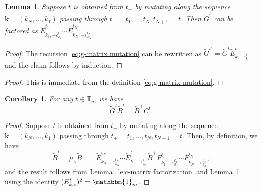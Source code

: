 \documentclass{amsart}
\newtheorem{corollary}[theorem]{Corollary}
\newtheorem{lemma}[theorem]{Lemma}
\numberwithin{theorem}{section}
\newcommand{\bfk}{{\boldsymbol{k}}}
\newcommand{\TT}{\mathbb{T}}
\newcommand{\bOne}{\mathbbm{1}}
\begin{document}
  \begin{lemma}
    \label{le:g-matrix factorization}
    Suppose $t$ is obtained from $t_+$ by mutating along the sequence $\bfk=(k_N,\ldots,k_1)$ passing through $t_+=t_1,\ldots,t_N,t_{N+1}=t$.
    Then $\widetilde G^t$ can be factored as $\widetilde E^{t_1}_{k_1,-\varepsilon^{t_1}_{k_1}}\cdots \widetilde E^{t_N}_{k_N,-\varepsilon^{t_N}_{k_N}}$.
  \end{lemma}
  \begin{proof}
    The recursion \eqref{eq:g-matrix mutation} can be rewritten as $\widetilde G^{t'}=\widetilde G^t \widetilde E^t_{k,-\varepsilon^t_k}$ and the claim follows by induction.
  \end{proof}
  \begin{proof}
    This is immediate from the definition \eqref{eq:g-matrix mutation}.
  \end{proof}

  \begin{corollary}
    For any $t\in\TT_n$, we have
    \[\widetilde G^t\widetilde B^t=\widetilde B^+ C^t.\]
  \end{corollary}
  \begin{proof}
    Suppose $t$ is obtained from $t_+$ by mutating along the sequence $\bfk=(k_N,\ldots,k_1)$ passing through $t_+=t_1,\ldots,t_N,t_{N+1}=t$.
    Then, by definition, we have
    \[ \widetilde B^t = \mu_\bfk \widetilde B^+ = \widetilde E^{t_N}_{k_N,-\varepsilon^{t_N}_{k_N}}\cdots \widetilde E^{t_1}_{k_1,-\varepsilon^{t_1}_{k_1}} \widetilde B^+ F^{t_1}_{k_1,-\varepsilon^{t_1}_{k_1}}\cdots F^{t_N}_{k_N,-\varepsilon^{t_N}_{k_N}}, \]
    and the result follows from Lemma~\ref{le:c-matrix factorization} and Lemma~\ref{le:g-matrix factorization} using the identity $(E^t_{k,\varepsilon})^2=\bOne_m$.
  \end{proof}
\end{document}
